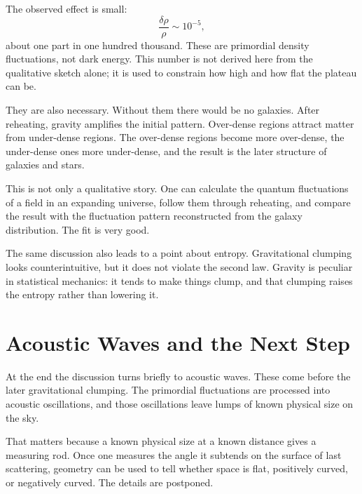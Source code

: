 The observed effect is small:
\begin{equation}
\frac{\delta\rho}{\rho}\sim 10^{-5},
\end{equation}
about one part in one hundred thousand. These are primordial density fluctuations, not dark energy. This number is not derived here from the qualitative sketch alone; it is used to constrain how high and how flat the plateau can be.

They are also necessary. Without them there would be no galaxies. After reheating, gravity amplifies the initial pattern. Over-dense regions attract matter from under-dense regions. The over-dense regions become more over-dense, the under-dense ones more under-dense, and the result is the later structure of galaxies and stars.

This is not only a qualitative story. One can calculate the quantum fluctuations of a field in an expanding universe, follow them through reheating, and compare the result with the fluctuation pattern reconstructed from the galaxy distribution. The fit is very good.

The same discussion also leads to a point about entropy. Gravitational clumping looks counterintuitive, but it does not violate the second law. Gravity is peculiar in statistical mechanics: it tends to make things clump, and that clumping raises the entropy rather than lowering it.

\begin{classroomqa}
\end{classroomqa}

\section{Acoustic Waves and the Next Step}

At the end the discussion turns briefly to acoustic waves. These come before the later gravitational clumping. The primordial fluctuations are processed into acoustic oscillations, and those oscillations leave lumps of known physical size on the sky.

That matters because a known physical size at a known distance gives a measuring rod. Once one measures the angle it subtends on the surface of last scattering, geometry can be used to tell whether space is flat, positively curved, or negatively curved. The details are postponed.

\begin{classroomqa}
\end{classroomqa}
